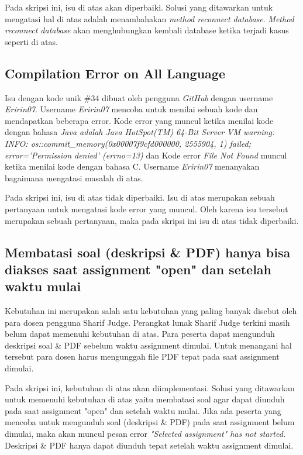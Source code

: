 Pada skripsi ini, isu di atas akan diperbaiki. Solusi yang ditawarkan untuk mengatasi hal di atas adalah menambahakan \textit{method reconnect database}. \textit{Method reconnect database} akan menghubungkan kembali database ketika terjadi kasus seperti di atas.

\subsection{Compilation Error on All Language}
Isu dengan kode unik \#34 dibuat oleh pengguna \textit{GitHub} dengan username \textit{Eririn07}. Username \textit{Eririn07} mencoba untuk menilai sebuah kode dan mendapatkan beberapa error. Kode error yang muncul ketika menilai kode dengan bahasa \textit{Java adalah Java HotSpot(TM) 64-Bit Server VM warning: INFO: os::commit\_memory(0x00007f9cfd000000, 2555904, 1) failed; error='Permission denied' (errno=13)} dan Kode error \textit{File Not Found} muncul ketika menilai kode dengan bahasa C. Username \textit{Eririn07} menanyakan bagaimana mengatasi masalah di atas.

Pada skripsi ini, isu di atas tidak diperbaiki. Isu di atas merupakan sebuah pertanyaan untuk mengatasi kode error yang muncul. Oleh karena isu tersebut merupakan sebuah pertanyaan, maka pada skripsi ini isu di atas tidak diperbaiki.

\subsection{Membatasi soal (deskripsi \& PDF) hanya bisa diakses saat assignment "open" dan setelah waktu mulai}
\label{subsec:membatasisoal}
Kebutuhan ini merupakan salah satu kebutuhan yang paling banyak disebut oleh para dosen pengguna Sharif Judge. Perangkat lunak Sharif Judge terkini masih belum dapat memenuhi kebutuhan di atas. Para peserta dapat mengunduh deskripsi soal \& PDF sebelum waktu assignment dimulai. Untuk menangani hal tersebut para dosen harus mengunggah file PDF tepat pada saat assignment dimulai. 

Pada skripsi ini, kebutuhan di atas akan diimplementasi. Solusi yang ditawarkan untuk memenuhi kebutuhan di atas yaitu membatasi soal agar dapat diunduh pada saat assignment "open" dan setelah waktu mulai. Jika ada peserta yang mencoba untuk mengunduh soal (deskripsi \& PDF) pada saat assignment belum dimulai, maka akan muncul pesan error \textit{"Selected \textit{assignment"} has not started.} Deskripsi \& PDF hanya dapat diunduh tepat setelah waktu assignment dimulai.

